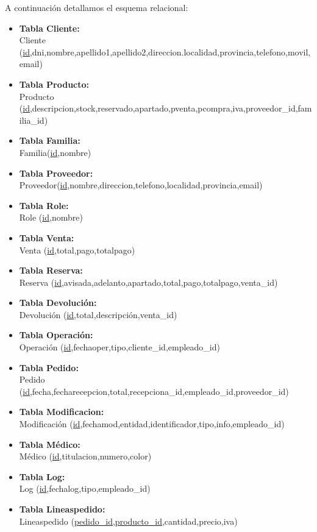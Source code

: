 A continuación detallamos el esquema relacional:\\
\begin{itemize}
\item \textbf{Tabla Cliente:}\\
Cliente (\underline{id},dni,nombre,apellido1,apellido2,direccion.localidad,provincia,telefono,movil,email)
\item\textbf{Tabla Producto:}\\
Producto (\underline{id},descripcion,stock,reservado,apartado,pventa,pcompra,iva,proveedor\_id,familia\_id)
\item\textbf{Tabla Familia:}\\
Familia(\underline{id},nombre)
\item \textbf{Tabla Proveedor:}\\
Proveedor(\underline{id},nombre,direccion,telefono,localidad,provincia,email)
\item \textbf{Tabla Role:}\\
Role (\underline{id},nombre) 
\item \textbf{Tabla Venta:}\\
Venta (\underline{id},total,pago,totalpago) 
\item \textbf{Tabla Reserva:}\\
Reserva (\underline{id},avisada,adelanto,apartado,total,pago,totalpago,venta\_id) 
\item \textbf{Tabla Devolución:}\\
Devolución (\underline{id},total,descripción,venta\_id)
 \item \textbf{Tabla Operación:}\\
Operación (\underline{id},fechaoper,tipo,cliente\_id,empleado\_id)
\item \textbf{Tabla Pedido:}\\
Pedido (\underline{id},fecha,fecharecepcion,total,recepciona\_id,empleado\_id,proveedor\_id)
\item \textbf{Tabla Modificacion:}\\
Modificación (\underline{id},fechamod,entidad,identificador,tipo,info,empleado\_id)
\item \textbf{Tabla Médico:}\\
Médico (\underline{id},titulacion,numero,color)
\item \textbf{Tabla Log:}\\
Log (\underline{id},fechalog,tipo,empleado\_id)
\item \textbf{Tabla Lineaspedido:}\\
Lineaspedido (\underline{pedido\_id},\underline{producto\_id},cantidad,precio,iva)

\end{itemize}
